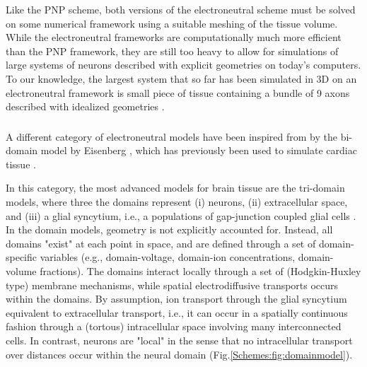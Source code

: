 Like the PNP scheme, both versions of the electroneutral scheme must be solved on some numerical framework using a suitable meshing of the tissue volume. While the electroneutral frameworks are computationally much more efficient than the PNP framework, they are still too heavy to allow for simulations of large systems of neurons described with explicit geometries on today's computers. To our knowledge, the largest system that so far has been simulated in 3D on an electroneutral framework is small piece of tissue containing a bundle of 9 axons described with idealized geometries \citep{ellingsrud2020}.



\subsubsection{}
\label{sec:Schemes:domain}
A different category of electroneutral models have been inspired from by the bi-domain model by Eisenberg \citep{eisenberg1970}, which has previously been used to simulate cardiac tissue \citep{henriquez1993, sundnes2006, Mori2008}. 

In this category, the most advanced models for brain tissue are the tri-domain models, where three the domains represent (i) neurons, (ii) extracellular space, and (iii) a glial syncytium, i.e., a populations of gap-junction coupled glial cells \citep{OConnell2016, tuttle2019}. In the domain models, geometry is not explicitly accounted for. Instead, all domains "exist" at each point in space, and are defined through a set of domain-specific variables (e.g., domain-voltage, domain-ion concentrations, domain-volume fractions). The domains interact locally through a set of (Hodgkin-Huxley type) membrane mechanisms, while spatial electrodiffusive transports occurs within the domains. By assumption, ion transport through the glial syncytium equivalent to extracellular transport, i.e., it can occur in a spatially continuous fashion through a (tortous) intracellular space involving many interconnected cells. In contrast, neurons are "local" in the sense that no intracellular transport over distances occur within the neural domain (Fig.\ref{Schemes:fig:domainmodel}). 

